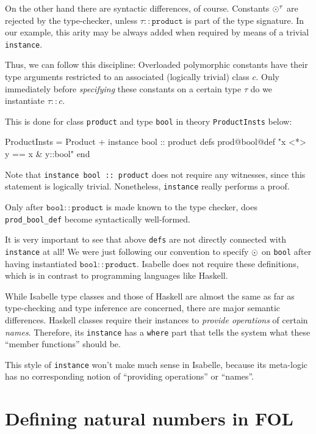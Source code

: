\begin{ascbox}
\begin{ascbox}
\begin{ascbox}
\begin{ascbox}
\begin{ascbox}
\begin{ascbox}
\begin{ascbox}
\begin{ascbox}
\begin{ascbox}
\begin{ascbox}
On the other hand there are syntactic differences, of course.
Constants $\odot^\tau$ are rejected by the type-checker, unless $\tau
:: \texttt{product}$ is part of the type signature.  In our example, this
arity may be always added when required by means of a trivial
\texttt{instance}.

Thus, we can follow this discipline: Overloaded polymorphic constants
have their type arguments restricted to an associated (logically
trivial) class $c$. Only immediately before \emph{specifying} these
constants on a certain type $\tau$ do we instantiate $\tau :: c$.

This is done for class \texttt{product} and type \texttt{bool} in theory
\texttt{ProductInsts} below:

\begin{ascbox}
ProductInsts = Product +\medskip
instance
  bool :: product\medskip
defs
  prod@bool@def "x <*> y  == x & y::bool"\medskip
end

Note that \texttt{instance bool ::\ product} does not require any
witnesses, since this statement is logically trivial. Nonetheless,
\texttt{instance} really performs a proof.

Only after $\texttt{bool} :: \texttt{product}$ is made known to the type
checker, does \texttt{prod_bool_def} become syntactically well-formed.

\medskip

It is very important to see that above \texttt{defs} are not directly
connected with \texttt{instance} at all! We were just following our
convention to specify $\odot$ on \texttt{bool} after having instantiated
$\texttt{bool} :: \texttt{product}$. Isabelle does not require these definitions,
which is in contrast to programming languages like Haskell.

\medskip

While Isabelle type classes and those of Haskell are almost the same as
far as type-checking and type inference are concerned, there are major
semantic differences. Haskell classes require their instances to
\emph{provide operations} of certain \emph{names}. Therefore, its
\texttt{instance} has a \texttt{where} part that tells the system what these
``member functions'' should be.

This style of \texttt{instance} won't make much sense in Isabelle, because its
meta-logic has no corresponding notion of ``providing operations'' or
``names''.


\section{Defining natural numbers in FOL}
\label{sec:ex-natclass}


\end{ascbox}
\end{ascbox}
\end{ascbox}
\end{ascbox}
\end{ascbox}
\end{ascbox}
\end{ascbox}
\end{ascbox}
\end{ascbox}
\end{ascbox}
\end{ascbox}
